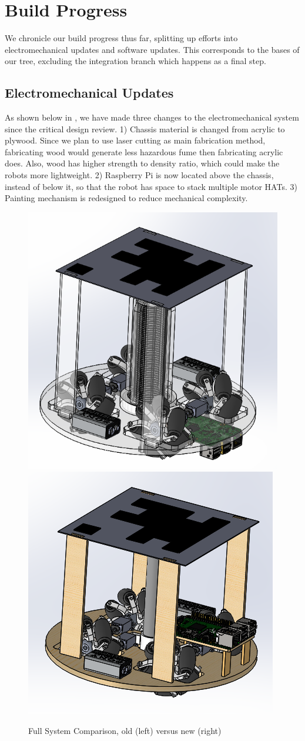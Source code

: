 
\section{Build Progress}
\label{sec:build_progress}

We chronicle our build progress thus far, splitting up efforts into electromechanical updates and software updates. This corresponds to the bases of our tree, excluding the integration branch which happens as a final step.

\subsection{Electromechanical Updates}
\label{sec:electromechanical_progress}

As shown below in , we have made three changes to the electromechanical system since the critical design review. 1) Chassis material is changed from acrylic to plywood. Since we plan to use laser cutting as main fabrication method, fabricating wood would generate less hazardous fume then fabricating acrylic does. Also, wood has higher strength to density ratio, which could make the robots more lightweight. 2) Raspberry Pi is now located above the chassis, instead of below it, so that the robot has space to stack multiple motor HATs. 3) Painting mechanism is redesigned to reduce mechanical complexity.

\begin{figure}[h!]
\centering
\includegraphics[width=0.49\columnwidth]{CAD/full_old.PNG}
\includegraphics[width=0.49\columnwidth]{CAD/full_new.PNG}
\label{fig:em1}
\caption{Full System Comparison, old (left) versus new (right)}
\end{figure}

